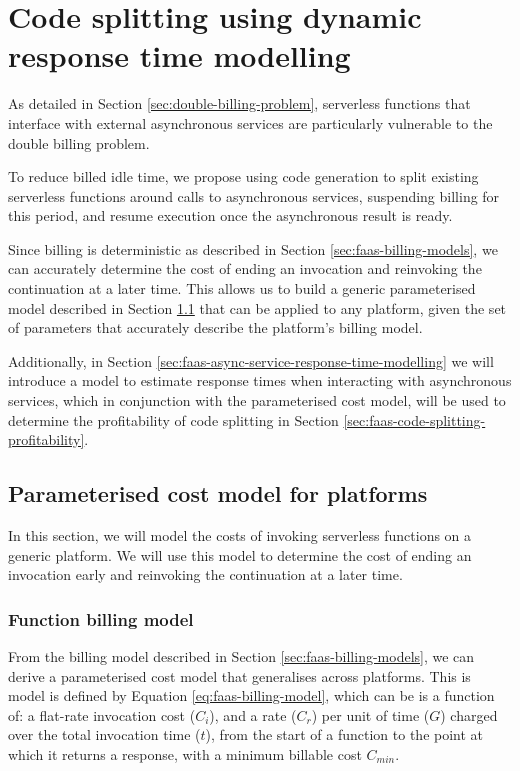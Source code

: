 \chapter{Code splitting using dynamic response time modelling}

As detailed in Section \ref{sec:double-billing-problem}, serverless functions that interface with external asynchronous services are particularly vulnerable to the double billing problem.

To reduce billed idle time, we propose using code generation to split existing serverless functions around calls to asynchronous services, suspending billing for this period, and resume execution once the asynchronous result is ready.

Since \faaas{} billing is deterministic as described in Section \ref{sec:faas-billing-models}, we can accurately determine the cost of ending an invocation and reinvoking the continuation at a later time. This allows us to build a generic parameterised model described in Section \ref{sec:faas-param-cost-model} that can be applied to any \faas{} platform, given the set of parameters that accurately describe the platform's billing model.

Additionally, in Section \ref{sec:faas-async-service-response-time-modelling} we will introduce a model to estimate response times when interacting with asynchronous services, which in conjunction with the parameterised cost model, will be used to determine the profitability of code splitting in Section \ref{sec:faas-code-splitting-profitability}.

\section{Parameterised cost model for \faas{} platforms}
\label{sec:faas-param-cost-model}

In this section, we will model the costs of invoking serverless functions on a generic \faas{} platform. We will use this model to determine the cost of ending an invocation early and reinvoking the continuation at a later time.

\subsection{Function billing model}

From the billing model described in Section \ref{sec:faas-billing-models}, we can derive a parameterised cost model that generalises across \faas{} platforms. This is model is defined by Equation \ref{eq:faas-billing-model}, which can be is  a function of: a flat-rate invocation cost ($C_i$), and a rate ($C_r$) per unit of time ($G$) charged over the total invocation time ($t$), from the start of a function to the point at which it returns a response, with a minimum billable cost $C_{min}$.


